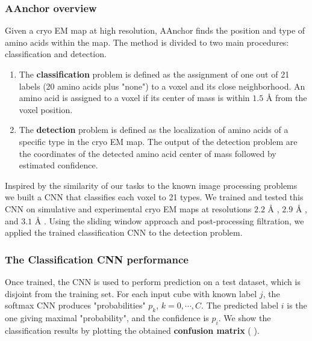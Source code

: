 \subsubsection{AAnchor overview}
Given a cryo EM map at high resolution, 
AAnchor finds the position and type of amino acids within the map.
The method is divided to two main procedures: classification and detection. 
\begin{enumerate}
\item 
The \textbf{classification} problem is defined as the assignment of one out of 21 labels (20 amino acids plus "none") to a voxel and its close neighborhood. An amino acid  is assigned to a voxel if its center of mass is within $1.5$ {\AA}   from the  voxel position.
\item
The \textbf{detection} problem is defined as the localization of amino acids of a specific type in the cryo EM map.
The output of the detection problem are the coordinates of the detected amino acid center of mass followed by estimated confidence.
\end{enumerate}


 Inspired by the similarity of our tasks to the known image processing problems we built a CNN that classifies each voxel to 21 types. 
We  trained and tested this CNN on simulative and experimental cryo EM maps at  resolutions $2.2$ {\AA}  , $2.9$  {\AA} , and $3.1$ {\AA} .
Using the sliding window approach and post-processing filtration, we applied  the trained  classification CNN to the detection problem.

\subsubsection{The Classification CNN performance}

Once trained, the CNN is used to perform prediction on a test dataset, which is disjoint from the training set.
For each input cube with known label $j$, the softmax CNN produces "probabilities" $p_k$, $k=0,\cdots,C$. 
The predicted label $i$ is the one giving maximal "probability", and the confidence is $p_i$.
We show the classification results  by plotting the obtained  \textbf{confusion matrix} ( \cite{Fawcett2006}).


